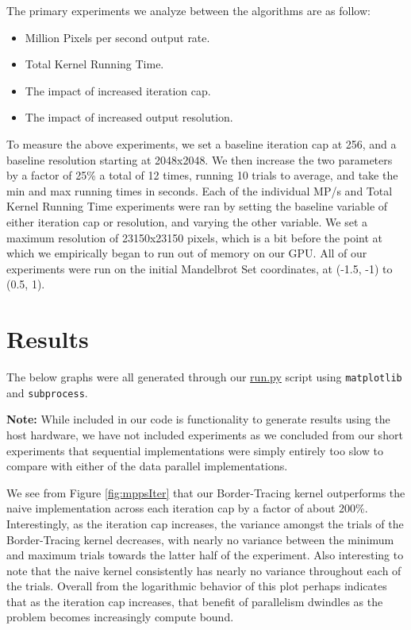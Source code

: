 \documentclass[letterpaper]{article}
\begin{document}
\begin{multicols}{2}
The primary experiments we analyze between the algorithms are as follow:

\begin{itemize}
  \item Million Pixels per second output rate.
  \item Total Kernel Running Time. 
  \item The impact of increased iteration cap.
  \item The impact of increased output resolution.
\end{itemize}

To measure the above experiments, we set a baseline iteration cap at 256, and a
  baseline resolution starting at 2048x2048. We then increase the two parameters 
  by a factor of 25\% a total of 12 times, running 10 trials to average, and
  take the min and max running times in seconds. 
Each of the individual MP/s and Total Kernel Running Time experiments were ran
  by setting the baseline variable of either iteration cap or resolution, and
  varying the other variable.  
We set a maximum resolution of 23150x23150 pixels, which is a bit before the
  point at which we empirically began to run out of memory on our GPU.
All of our experiments were run on the initial Mandelbrot Set coordinates, at
  (-1.5, -1) to (0.5, 1).

  \section{Results}

The below graphs were all generated through our \url{run.py} script using
  \texttt{matplotlib} and \texttt{subprocess}. 

\textbf{Note:} While included in our code is functionality to generate results
  using the host hardware, we have not included experiments as we concluded from
  our short experiments that sequential implementations were simply entirely too
  slow to compare with either of the data parallel implementations.

We see from Figure \ref{fig:mppsIter} that our Border-Tracing kernel
  outperforms the naive implementation across each iteration cap by a factor of
  about 200\%. Interestingly, as the iteration cap increases, the variance
  amongst the trials of the Border-Tracing kernel decreases, with nearly no 
  variance between the minimum and maximum trials towards the latter half of the 
  experiment. Also interesting to note that the naive kernel consistently has
  nearly no variance throughout each of the trials. 
Overall from the logarithmic behavior of this plot perhaps indicates that as the
  iteration cap increases, that benefit of parallelism dwindles as the problem
  becomes increasingly compute bound.  


\end{multicols}
\end{document}
